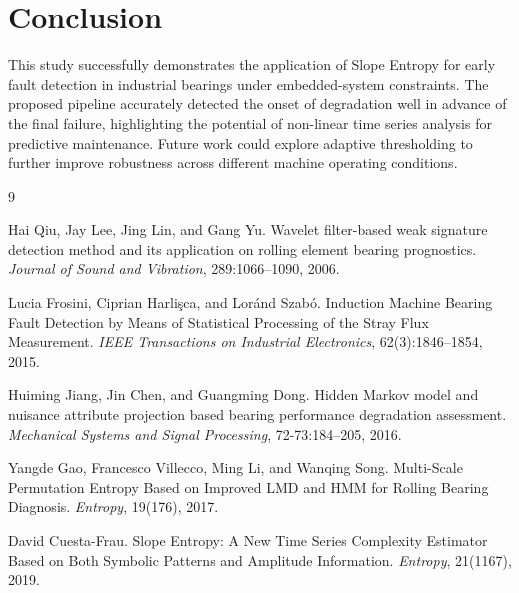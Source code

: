 \documentclass{article}
\begin{document}
\section{Conclusion}
This study successfully demonstrates the application of Slope Entropy for early fault detection in industrial bearings under embedded-system constraints. The proposed pipeline accurately detected the onset of degradation well in advance of the final failure, highlighting the potential of non-linear time series analysis for predictive maintenance. Future work could explore adaptive thresholding to further improve robustness across different machine operating conditions.

\begin{thebibliography}{9}

Hai Qiu, Jay Lee, Jing Lin, and Gang Yu.
\newblock Wavelet filter-based weak signature detection method and its application on rolling element bearing prognostics.
\newblock \emph{Journal of Sound and Vibration}, 289:1066--1090, 2006.

Lucia Frosini, Ciprian Harli{\c{s}}ca, and Lor{\'a}nd Szab{\'o}.
\newblock Induction Machine Bearing Fault Detection by Means of Statistical Processing of the Stray Flux Measurement.
\newblock \emph{IEEE Transactions on Industrial Electronics}, 62(3):1846--1854, 2015.

Huiming Jiang, Jin Chen, and Guangming Dong.
\newblock Hidden Markov model and nuisance attribute projection based bearing performance degradation assessment.
\newblock \emph{Mechanical Systems and Signal Processing}, 72-73:184--205, 2016.

Yangde Gao, Francesco Villecco, Ming Li, and Wanqing Song.
\newblock Multi-Scale Permutation Entropy Based on Improved LMD and HMM for Rolling Bearing Diagnosis.
\newblock \emph{Entropy}, 19(176), 2017.

David Cuesta-Frau.
\newblock Slope Entropy: A New Time Series Complexity Estimator Based on Both Symbolic Patterns and Amplitude Information.
\newblock \emph{Entropy}, 21(1167), 2019.

\end{thebibliography}
\end{document}
